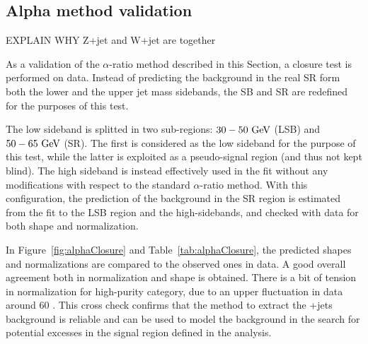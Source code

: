 \subsection{Alpha method validation}
\label{ssec:alpha_validation}
{\color{red} EXPLAIN WHY Z+jet and W+jet are together}

As a validation of the $\alpha$-ratio method described in this Section, a closure test is performed on data. Instead of predicting the background in the real \V SR form both the lower and the upper jet mass sidebands, the SB and SR are redefined for the purposes of this test. 

The low sideband is splitted in two sub-regions: $30-50~\text{GeV}$ (LSB) and $50-65~\text{GeV}$ (SR). The first is considered as the low sideband for the purpose of this test, while the latter is exploited as a pseudo-signal region (and thus not kept blind). The high sideband is instead effectively used in the fit without any modifications with respect to the standard $\alpha$-ratio method.
With this configuration, the prediction of the background in the SR region is estimated from the fit to the LSB region and the high-sidebands, and checked with data for both shape and normalization.

In Figure~\ref{fig:alphaClosure} and Table~\ref{tab:alphaClosure}, the predicted shapes and normalizations are compared to the observed ones in data. 
A good overall agreement both in normalization and shape is obtained. There is a bit of tension in normalization for high-purity category, due to an upper fluctuation in data around 60 \GeV.
This cross check confirms that the method to extract the \V+jets background is reliable and can be used to model the background in the search for potential excesses in the signal region defined in the analysis.






